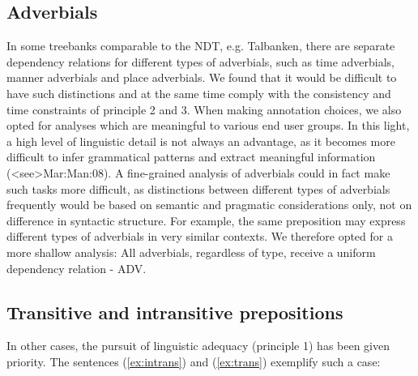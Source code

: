 \documentclass[11pt,a4paper]{article}
\begin{document}
\subsection{Adverbials}
In some treebanks comparable to the NDT, e.g. Talbanken, there are separate dependency relations for different types of adverbials, such as time adverbials, manner adverbials and place adverbials. 
We found that it would be difficult to have such distinctions and at the same time comply with the consistency and time constraints of principle 2 and 3. %
When making annotation choices, we also opted for analyses which are meaningful to various end user groups.
In this light, a high level of linguistic detail is not always an advantage, as it becomes more difficult to infer grammatical patterns and extract meaningful information (\citeNP<see>{Mar:Man:08}).
A fine-grained analysis of adverbials could in fact make such tasks more difficult, as distinctions between different types of adverbials frequently would be based on semantic and pragmatic considerations only, not on difference in syntactic structure.
For example, the same preposition may express different types of adverbials in very similar contexts.
We therefore opted for a more shallow analysis:
All adverbials, regardless of type,
receive a uniform dependency relation - ADV. 

\subsection{Transitive and intransitive prepositions}
In other cases, the pursuit of linguistic adequacy (principle 1) has been given priority. The sentences (\ref{ex:intrans}) and (\ref{ex:trans}) exemplify such a case:
\end{document}
